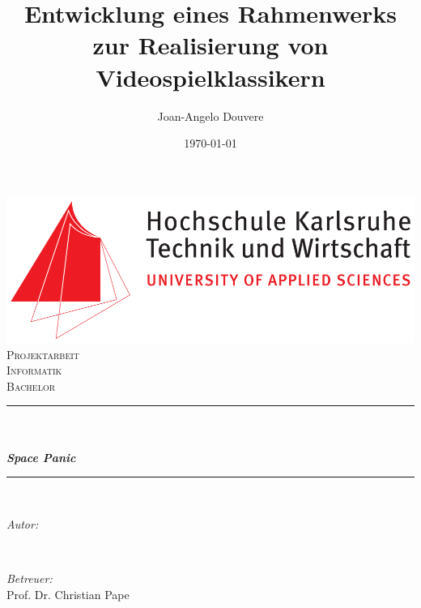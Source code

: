 \documentclass[12pt]{article}
\title{Entwicklung eines Rahmenwerks zur Realisierung von Videospielklassikern} %
\author{Joan-Angelo Douvere} %
\date{\today} %
\makeatletter
\let\thetitle\@title
\let\theauthor\@author
\let\thedate\@date
\makeatother
\begin{document}

\begin{titlepage}
	\centering
    \vspace*{0.5 cm}
    \includegraphics[scale = 0.25]{images/Hska_logo}\\[1.0 cm]
    \textsc{\LARGE Projektarbeit}\\[2.0 cm]
	\textsc{\Large Informatik}\\[0.5 cm]
	\textsc{\large Bachelor}\\[0.5 cm]
	\rule{\linewidth}{0.2 mm} \\[0.4 cm]
	{ \huge \bfseries \thetitle}\\ [0.3 cm]
    { \LARGE \bfseries \textit{Space Panic}}\\
	\rule{\linewidth}{0.2 mm} \\[1.5 cm]
    
	
	\begin{minipage}{0.4\textwidth}
		\begin{flushleft} \large
			\emph{Autor:}\\
			\theauthor
			\end{flushleft}
			\end{minipage}~
			\begin{minipage}{0.4\textwidth}
			\begin{flushright} \large
			\emph{Betreuer:} \\
			Prof. Dr. Christian Pape
		\end{flushright}
	\end{minipage}\\[2 cm]
	
	{\large \thedate}\\[2 cm]
 
	\vfill
	
\end{titlepage}

    
\end{document}
